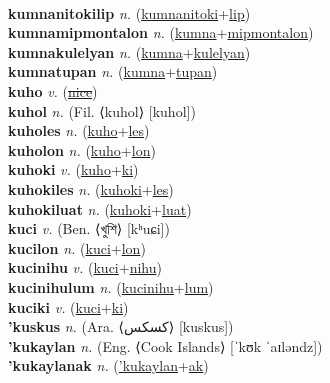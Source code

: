  \label{kumnanitoki} \\
\textbf{kumnanitokilip} \textit{n.} (\hyperref[kumnanitoki]{kumnanitoki}+\hyperref[lip]{lip})
 \label{kumnanitokilip} \\
\textbf{kumnamipmontalon} \textit{n.} (\hyperref[kumna]{kumna}+\hyperref[mipmontalon]{mipmontalon})
 \label{kumnamipmontalon} \\
\textbf{kumnakulelyan} \textit{n.} (\hyperref[kumna]{kumna}+\hyperref[kulelyan]{kulelyan})
 \label{kumnakulelyan} \\
\textbf{kumnatupan} \textit{n.} (\hyperref[kumna]{kumna}+\hyperref[tupan]{tupan})
 \label{kumnatupan} \\
\textbf{kuho} \textit{v.} (\hyperref[nice]{\sout{nice}})
 \label{kuho} \\
\textbf{kuhol} \textit{n.} (Fil. ⟨kuhol⟩ [kuhol])
 \label{kuhol} \\
\textbf{kuholes} \textit{n.} (\hyperref[kuho]{kuho}+\hyperref[les]{les})
 \label{kuholes} \\
\textbf{kuholon} \textit{n.} (\hyperref[kuho]{kuho}+\hyperref[lon]{lon})
 \label{kuholon} \\
\textbf{kuhoki} \textit{v.} (\hyperref[kuho]{kuho}+\hyperref[ki]{ki})
 \label{kuhoki} \\
\textbf{kuhokiles} \textit{n.} (\hyperref[kuhoki]{kuhoki}+\hyperref[les]{les})
 \label{kuhokiles} \\
\textbf{kuhokiluat} \textit{n.} (\hyperref[kuhoki]{kuhoki}+\hyperref[luat]{luat})
 \label{kuhokiluat} \\
\textbf{kuci} \textit{v.} (Ben. ⟨খুশি⟩ [kʰuɕi])
 \label{kuci} \\
\textbf{kucilon} \textit{n.} (\hyperref[kuci]{kuci}+\hyperref[lon]{lon})
 \label{kucilon} \\
\textbf{kucinihu} \textit{v.} (\hyperref[kuci]{kuci}+\hyperref[nihu]{nihu})
 \label{kucinihu} \\
\textbf{kucinihulum} \textit{n.} (\hyperref[kucinihu]{kucinihu}+\hyperref[lum]{lum})
 \label{kucinihulum} \\
\textbf{kuciki} \textit{v.} (\hyperref[kuci]{kuci}+\hyperref[ki]{ki})
 \label{kuciki} \\
\textbf{'kuskus} \textit{n.} (Ara. ⟨كسكس⟩ [kuskus])
 \label{'kuskus} \\
\textbf{'kukaylan} \textit{n.} (Eng. ⟨Cook Islands⟩ [ˈkʊk ˈaɪləndz])
 \label{'kukaylan} \\
\textbf{'kukaylanak} \textit{n.} (\hyperref['kukaylan]{'kukaylan}+\hyperref[ak]{ak})
 \label{'kukaylanak} \\
